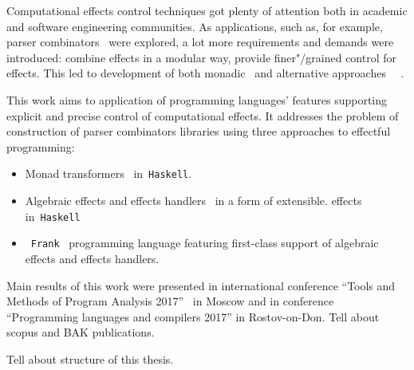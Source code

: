 Computational effects control techniques got plenty of attention both in academic and software engineering communities. As applications, such as, for example, parser combinators~\cite{monParsing} were explored, a lot more requirements and demands
were introduced: combine effects in a modular way, provide finer"/grained control
for effects. This led to development of both monadic~\cite{Liang:1995:MTM:199448.199528} and alternative approaches~\cite{Mcbride:2008:APE:1348940.1348941}
~\cite{DBLP:journals/jlp/BauerP15}.

This work aims to application of programming languages' features supporting explicit
and precise control of computational effects. It addresses the problem
of construction of parser combinators libraries using three approaches to
effectful programming:

\begin{itemize}
  \item Monad transformers~\cite{Liang:1995:MTM:199448.199528} in~\texttt{Haskell}.
  \item Algebraic effects and effects handlers~\cite{DBLP:journals/jlp/BauerP15}
  in a form of extensible.
  effects~\cite{Kiselyov:2013:EEA:2578854.2503791} in~\texttt{Haskell}
  \item~\texttt{Frank}~\cite{DBLP:conf/popl/LindleyMM17} programming language featuring first-class support of algebraic
  effects and effects handlers.
\end{itemize}

Main results of this work were presented in  international conference ``Tools and Methods of Program Analysis 2017''~\cite{tmpa} in Moscow and in conference
``Programming languages and compilers 2017'' in Rostov-on-Don.
Tell about scopus and BAK publications.

Tell about structure of this thesis.


